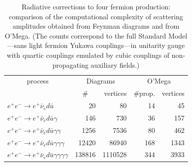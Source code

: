 \documentclass[12pt,a4paper]{article}
\begin{document}
\begin{table}
  \begin{center}
    \begin{tabular}{l|rr|rr}
                    \multicolumn{1}{c|}{process}
                  & \multicolumn{2}{c|}{Diagrams}
                  & \multicolumn{2}{c}{O'Mega} \\
                  & \multicolumn{1}{c}{\#} & vertices
                  & \#prop. & vertices \\%
      $e^+e^-\to e^+\bar\nu_e d\bar u$
        &     20 &      80 &  14 &   45 \\
      $e^+e^-\to e^+\bar\nu_e d\bar u \gamma$
        &    146 &     730 &  36 &  157 \\
      $e^+e^-\to e^+\bar\nu_e d\bar u \gamma\gamma$
        &   1256 &    7536 &  80 &  462 \\
      $e^+e^-\to e^+\bar\nu_e d\bar u \gamma\gamma\gamma$
        &  12420 &   86940 & 168 & 1343 \\
      $e^+e^-\to e^+\bar\nu_e d\bar u \gamma\gamma\gamma\gamma$
        & 138816 & 1110528 & 344 & 3933
    \end{tabular}
  \end{center}
  \caption{\label{tab:4fgamma}%
    Radiative corrections to four fermion production: comparison of
    the computational complexity of scattering amplitudes obtained
    from Feynman diagrams and from O'Mega. (The counts correspond to
    the full Standard Model---sans light fermion Yukawa couplings---in
    unitarity gauge with quartic couplings emulated by cubic 
    couplings of non-propagating auxiliary fields.)}
\end{table}
\end{document}
